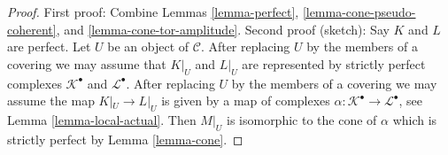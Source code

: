 \documentclass[10pt,a4paper]{amsart}
\theoremstyle{plain}
\theoremstyle{definition}
\theoremstyle{remark}
\numberwithin{equation}{subsection}
\begin{document}
\begin{proof}
First proof: Combine
Lemmas \ref{lemma-perfect}, \ref{lemma-cone-pseudo-coherent}, and
\ref{lemma-cone-tor-amplitude}.
Second proof (sketch): Say $K$ and $L$ are perfect. Let $U$ be an object
of $\mathcal{C}$. After replacing
$U$ by the members of a covering we may assume that $K|_U$ and $L|_U$
are represented by strictly perfect complexes $\mathcal{K}^\bullet$
and $\mathcal{L}^\bullet$. After replacing $U$ by the members
of a covering we may assume the map $K|_U \to L|_U$ is given by
a map of complexes $\alpha : \mathcal{K}^\bullet \to \mathcal{L}^\bullet$,
see Lemma \ref{lemma-local-actual}.
Then $M|_U$ is isomorphic to the cone of $\alpha$ which is strictly
perfect by Lemma \ref{lemma-cone}.
\end{proof}
\end{document}

